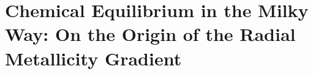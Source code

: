 \documentclass[main.tex]{subfiles}
\begin{document}
\chapter{Chemical Equilibrium in the Milky Way: On the Origin of the Radial
Metallicity Gradient}
\label{outflows}





\end{document}
